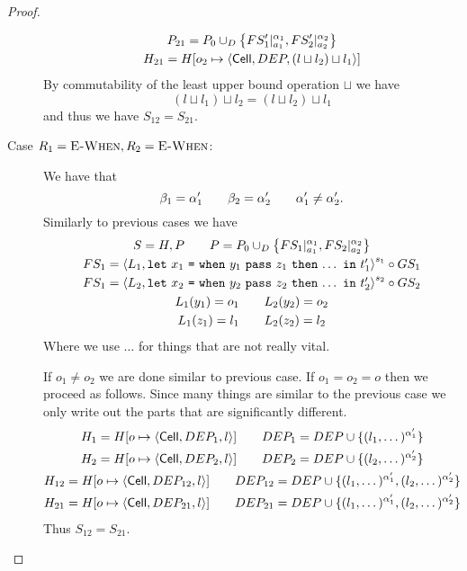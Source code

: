 \begin{proof}
\begin{description}
\begin{equation}
\begin{gathered}
          P_{21} = P_0 \cup_D \left\{ FS'_1|_{a_1}^{\alpha_1},
          FS'_2|_{a_2}^{\alpha_2} \right\} \\
          H_{21} = H[o_2 \mapsto \mbox{$\langle \mbox{$\mathsf{Cell}$}{}, DEP, (l \sqcup l_2) \sqcup l_1 \rangle$}]
        \end{gathered}
      \end{equation}
      By commutability of the least upper bound operation $\sqcup$ we have
      \begin{equation}
        (l \sqcup l_1) \sqcup l_2 = (l \sqcup l_2) \sqcup l_1
      \end{equation}
      and thus we have $S_{12} = S_{21}$.
    \item[Case $R_1 = \mbox{{\sc E-When}}, R_2 = \mbox{{\sc E-When}}$:] We have that
      \begin{equation}
        \beta_1 = \alpha'_1 \quad\quad \beta_2 = \alpha'_2 \quad\quad \alpha'_1 \neq
        \alpha'_2.
      \end{equation}
      Similarly to previous cases we have
      \begin{equation}
        \begin{gathered}
          S = H, P \quad\quad P = P_0 \cup_D \left\{ FS_1|_{a_1}^{\alpha_1},
          FS_2|_{a_2}^{\alpha_2} \right\} \\
          FS_1 = \mbox{$\langle L_1, \mbox{\mdseries\texttt{let}~$x_1$~\texttt{=}~$\mbox{\mdseries\texttt{when}~$y_1$~\texttt{pass}~$z_1$~\texttt{then}~$\dots$}$~\texttt{in}~$t'_1$} \rangle$}^{s_1} \circ GS_1
          \\ 
          FS_1 = \mbox{$\langle L_2, \mbox{\mdseries\texttt{let}~$x_2$~\texttt{=}~$\mbox{\mdseries\texttt{when}~$y_2$~\texttt{pass}~$z_2$~\texttt{then}~$\dots$}$~\texttt{in}~$t'_2$} \rangle$}^{s_2}
          \circ GS_2 \\
          L_1(y_1) = o_1 \quad\quad L_2(y_2) = o_2 \\
          L_1(z_1) = l_1 \quad\quad L_2(z_2) = l_2
        \end{gathered}
      \end{equation}
      Where we use $\dots$ for things that are not really vital.

      If $o_1 \neq o_2$ we are done similar to previous case. If $o_1 = o_2 = o$
      then we proceed as follows. Since many things are similar to the previous
      case we only write out the parts that are significantly different.
      \begin{equation}
        \begin{gathered}
          H_1 = H[o \mapsto \mbox{$\langle \mbox{$\mathsf{Cell}$}{}, DEP_1, l \rangle$}] \quad\quad DEP_1 = DEP \cup \{ (l_1,
          \dots)^{\alpha'_1} \} \\
          H_2 = H[o \mapsto \mbox{$\langle \mbox{$\mathsf{Cell}$}{}, DEP_2, l \rangle$}] \quad\quad DEP_2 = DEP \cup \{ (l_2,
          \dots)^{\alpha'_2} \} \\
          H_{12} = H[o \mapsto \mbox{$\langle \mbox{$\mathsf{Cell}$}{}, DEP_{12}, l \rangle$}] \quad\quad DEP_{12} = DEP \cup \{ (l_1,
          \dots)^{\alpha'_1}, (l_2, \dots)^{\alpha'_2} \} \\
          H_{21} = H[o \mapsto \mbox{$\langle \mbox{$\mathsf{Cell}$}{}, DEP_{21}, l \rangle$}] \quad\quad DEP_{21} = DEP \cup \{ (l_1,
          \dots)^{\alpha'_1}, (l_2, \dots)^{\alpha'_2} \} \\
        \end{gathered}
      \end{equation}
      Thus $S_{12} = S_{21}$.


\end{description}
\end{proof}
